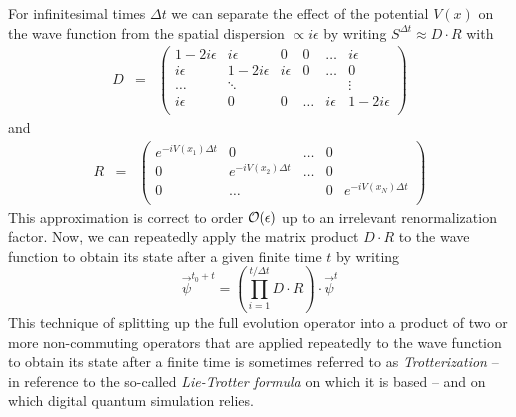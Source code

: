%
For infinitesimal times $\Delta t$ we can separate the effect of the potential $V(x)$ on the wave function from the spatial dispersion $\propto i\epsilon$ by writing $S^{\Delta t} \approx D\cdot R$ with 
%
\begin{eqnarray}
D & = & \left( 
		\begin{array}{cccccc}
		1-2i \epsilon & i\epsilon & 0 & 0 & \hdots & i\epsilon \\
		i \epsilon & 1 - 2i \epsilon & i \epsilon & 0 & \hdots & 0 \\
		\hdots & \ddots & & & & \vdots \\
		i \epsilon & 0 & 0 &  \hdots & i\epsilon & 1-2i \epsilon \\
		\end{array}
	\right)
\end{eqnarray}
%
and 
%
\begin{eqnarray}
R & = & \left( \begin{array}{ccccc}
	e^{-i V(x_1) \Delta t} & 0 & \hdots & 0 \\
	0 & e^{-i V (x_2) \Delta t} & \hdots & 0 \\
	0 & \hdots & & 0 & e^{-i V (x_N) \Delta t} \\
	\end{array}
	\right)
\end{eqnarray}
%
This approximation is correct to order $\begin{mathcal}O\end{mathcal}(\epsilon)$ up to an irrelevant renormalization factor. Now, we can repeatedly apply the matrix product $D\cdot R$ to the wave function to obtain its state after a given finite time $t$ by writing
%
\begin{equation}
\vec{\psi}^{t_0+t} = \left(\prod\limits_{i = 1}^{t/\Delta t} D\cdot R\right)\cdot \vec{\psi}^{t} \label{eq:trotter_evolution}
\end{equation}
%
This technique of splitting up the full evolution operator into a product of two or more non-commuting operators that are applied repeatedly to the wave function to obtain its state after a finite time is sometimes referred to as {\it Trotterization} -- in reference to the so-called {\it Lie-Trotter formula} on which it is based -- and on which digital quantum simulation relies\citep{lloyd_universal_1996,lanyon_universal_2011}.

\smallskip

